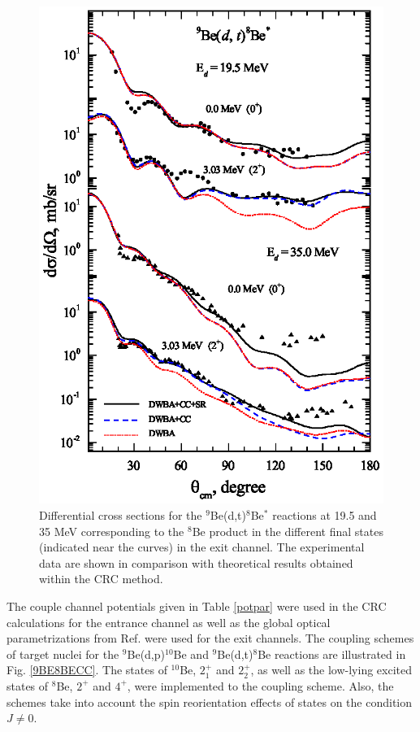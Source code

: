 \documentclass[10pt]{iopart}
\begin{document}
\begin{figure}[tp]
\includegraphics[scale=0.8]{3H8BE.eps}
\caption{
\label{3H8BE}
Differential cross sections for the ${}^9$Be(d,t)${}^{8}$Be$^*$ reactions at 19.5 and 35 MeV corresponding to the ${}^{8}$Be product in the different final states (indicated near the curves) in the exit channel. The experimental data are shown in comparison with  theoretical results obtained within the CRC method.}
\end{figure}

The couple channel potentials given in Table \ref{potpar} were used in the CRC calculations for the entrance channel as well as the global optical parametrizations from Ref. \cite{globalProton, globalTriton} were used for the exit channels. The coupling schemes of target nuclei for the ${}^9$Be(d,p)${}^{10}$Be and ${}^9$Be(d,t)${}^8$Be  reactions  are illustrated in Fig. \ref{9BE8BECC}. The states of ${}^{10}$Be, $2^+_{1}$ and $2^+_{2}$, as well as the low-lying excited states of ${}^8$Be, $2^+$ and $4^+$, were implemented to the coupling scheme. Also, the schemes take into account the spin reorientation effects of states on the condition $J \neq 0$.
\end{document}
